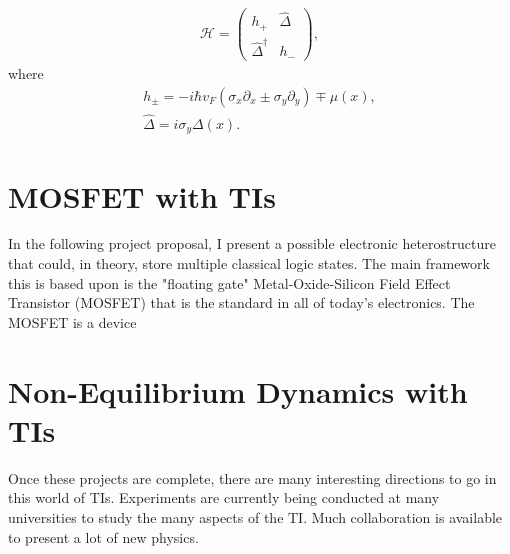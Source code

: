 \documentclass[12pt,twocolumn]{article}
\begin{document}
\begin{eqnarray}
&\mathcal{H}=\left(
\begin{array}{cc}
h_{+}  &  \hat{\Delta} \\
\hat{\Delta}^\dagger  &   h_{-}
\end{array}\label{fkmodel}
\right),&
\end{eqnarray}
where
\begin{eqnarray}
&h_{\pm}= -i\hbar  v_F (\sigma_x\partial_x \pm \sigma_y \partial_y) \mp \mu(x),&\\
&\hat{\Delta}= i\sigma_y  \Delta(x).&
\end{eqnarray}


\section*{MOSFET with TIs}
In the following project proposal, I present a possible electronic heterostructure that could, in theory, store multiple classical logic states. The main framework this is based upon is the "floating gate" Metal-Oxide-Silicon Field Effect Transistor (MOSFET) that is the standard in all of today's electronics. The MOSFET is a device
\section*{Non-Equilibrium Dynamics with TIs}
Once these projects are complete, there are many interesting directions to go in this world of TIs. Experiments are currently being conducted at many universities to study the many aspects of the TI. Much collaboration is available to present a lot of new physics.
\end{document}

